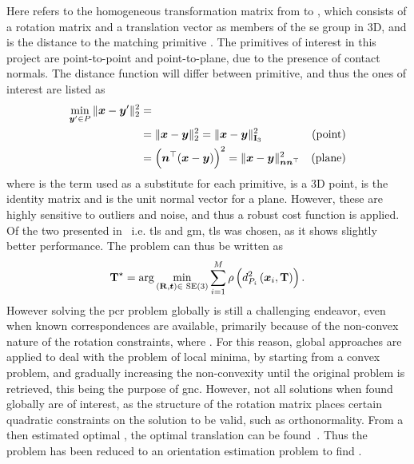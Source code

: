 Here  refers to the homogeneous transformation matrix  from  to , which consists of a rotation matrix  and a translation vector  as members of the \gls{se} group in 3D, and  is the distance to the matching primitive . The primitives of interest in this project are point-to-point and point-to-plane, due to the presence of contact normals. The distance function will differ between primitive, and thus the ones of interest are listed as
%
\begin{align}\label{eq:distance-functions}
	\min_{\vec{y}'\in P} \|\vec{x}-\vec{y}'\|^2_2 &=  \\
		& =\|\vec{x}-\vec{y}\|_2^2=\|\vec{x} - \vec{y}\|_{\mat{I}_3}^2 & \text{(point)} \\
		& = \left( \vec{n}^\T (\vec{x} - \vec{y}) \right)^2=\|\vec{x}-\vec{y}\|^2_{\vec{n}\vec{n}^\T} & \text{(plane)}
\end{align}
where  is the term used as a substitute for each primitive,  is a 3D point,  is the identity matrix and  is the unit normal vector for a plane. However, these are highly sensitive to outliers and noise, and thus a robust cost function \mvar{\rho(\cdot)} is applied. Of the two presented in~\cite{graduated-non-convexity-for-robust-spatial-perception:-from-non-minimal-solvers-to-global-outlier-rejection} i.e. \gls{tls} and \gls{gm}, \gls{tls} was chosen, as it shows slightly better performance. The problem can thus be written as
%
\begin{equation}\label{eq:point-cloud-registration-problem-robust}
		\tf[T]{\star}{} = \arg \min_{(\mat{R},\vec{t})\in\SE (3)} \sum^M_{i=1} \rho\left(d_{P_i}^2\left( \vec{x}_i, \mat{T} \right)\right).
\end{equation}
However solving the \gls{pcr} problem globally is still a challenging endeavor, even when known correspondences are available, primarily because of the non-convex nature of the rotation constraints, where . For this reason, global approaches are applied to deal with the problem of local minima, by starting from a convex problem, and gradually increasing the non-convexity until the original problem is retrieved, this being the purpose of \gls{gnc}. However, not all solutions when found globally are of interest, as the structure of the rotation matrix places certain quadratic constraints on the solution to be valid, such as orthonormality. From a then estimated optimal , the optimal translation  can be found~\cite{convex-global-3d-registration-with-lagrangian-duality}. Thus the problem has been reduced to an orientation estimation problem to find \tf[R]{\star}{}.

